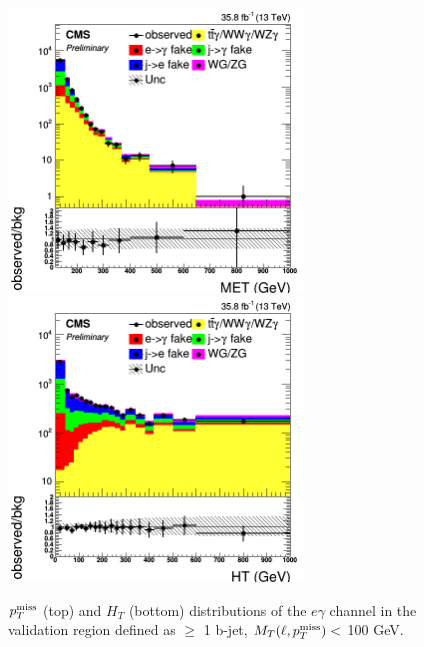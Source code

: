 \documentclass[thesis.tex]{subfiles}
\renewcommand\_{\textunderscore\allowbreak}
\begin{document}
\begin{figure}[hbtp]
  \centering
    \includegraphics[width=0.7\textwidth]{Figures/VALID_egamma_2016ReMiniAOD_met_TT.png} \\
    \includegraphics[width=0.7\textwidth]{Figures/VALID_egamma_2016ReMiniAOD_ht_TT.png}
  \caption{$p_T^\textrm{miss}$ (top) and $H_T$ (bottom) distributions of the $e\gamma$ channel in the validation region defined as $\ge$ 1 b-jet, $M_T(\ell,p_T^\textrm{miss}) <$ 100 GeV.}
    \label{fig:ttgvalidationeg}
\end{figure}
\end{document}
